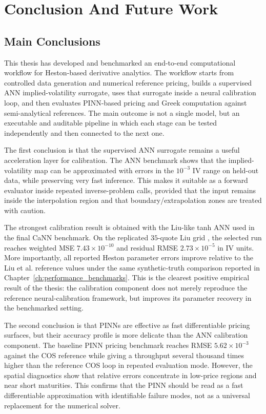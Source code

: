\chapter{Conclusion And Future Work}
\label{ch:conclusions}

\section{Main Conclusions}

This thesis has developed and benchmarked an end-to-end computational workflow for Heston-based derivative analytics. The workflow starts from controlled data generation and numerical reference pricing, builds a supervised ANN implied-volatility surrogate, uses that surrogate inside a neural calibration loop, and then evaluates PINN-based pricing and Greek computation against semi-analytical references. The main outcome is not a single model, but an executable and auditable pipeline in which each stage can be tested independently and then connected to the next one.

The first conclusion is that the supervised ANN surrogate remains a useful acceleration layer for calibration. The ANN benchmark shows that the implied-volatility map can be approximated with errors in the \(10^{-3}\) IV range on held-out data, while preserving very fast inference. This makes it suitable as a forward evaluator inside repeated inverse-problem calls, provided that the input remains inside the interpolation region and that boundary/extrapolation zones are treated with caution.

The strongest calibration result is obtained with the Liu-like tanh ANN used in the final CaNN benchmark. On the replicated \(35\)-quote Liu grid \cite{liu}, the selected run reaches weighted MSE \(7.43\times10^{-10}\) and residual RMSE \(2.73\times10^{-5}\) in IV units. More importantly, all reported Heston parameter errors improve relative to the Liu et al. reference values \cite{liu} under the same synthetic-truth comparison reported in Chapter~\ref{ch:performance_benchmarks}. This is the clearest positive empirical result of the thesis: the calibration component does not merely reproduce the reference neural-calibration framework, but improves its parameter recovery in the benchmarked setting.

The second conclusion is that PINNs are effective as fast differentiable pricing surfaces, but their accuracy profile is more delicate than the ANN calibration component. The baseline PINN pricing benchmark reaches RMSE \(5.62\times10^{-3}\) against the COS reference \cite{fang_oosterlee_2009} while giving a throughput several thousand times higher than the reference COS loop in repeated evaluation mode. However, the spatial diagnostics show that relative errors concentrate in low-price regions and near short maturities. This confirms that the PINN should be read as a fast differentiable approximation with identifiable failure modes, not as a universal replacement for the numerical solver.

